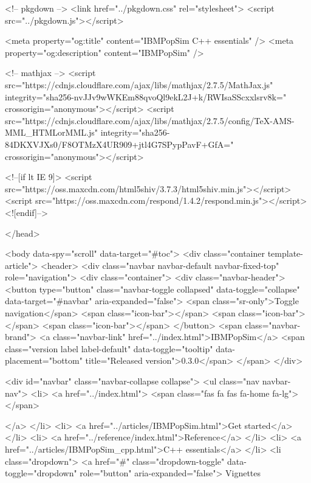 <!-- pkgdown -->
<link href="../pkgdown.css" rel="stylesheet">
<script src="../pkgdown.js"></script>




<meta property="og:title" content="IBMPopSim C++ essentials" />
<meta property="og:description" content="IBMPopSim" />




<!-- mathjax -->
<script src="https://cdnjs.cloudflare.com/ajax/libs/mathjax/2.7.5/MathJax.js" integrity="sha256-nvJJv9wWKEm88qvoQl9ekL2J+k/RWIsaSScxxlsrv8k=" crossorigin="anonymous"></script>
<script src="https://cdnjs.cloudflare.com/ajax/libs/mathjax/2.7.5/config/TeX-AMS-MML_HTMLorMML.js" integrity="sha256-84DKXVJXs0/F8OTMzX4UR909+jtl4G7SPypPavF+GfA=" crossorigin="anonymous"></script>

<!--[if lt IE 9]>
<script src="https://oss.maxcdn.com/html5shiv/3.7.3/html5shiv.min.js"></script>
<script src="https://oss.maxcdn.com/respond/1.4.2/respond.min.js"></script>
<![endif]-->



  </head>

  <body data-spy="scroll" data-target="#toc">
    <div class="container template-article">
      <header>
      <div class="navbar navbar-default navbar-fixed-top" role="navigation">
  <div class="container">
    <div class="navbar-header">
      <button type="button" class="navbar-toggle collapsed" data-toggle="collapse" data-target="#navbar" aria-expanded="false">
        <span class="sr-only">Toggle navigation</span>
        <span class="icon-bar"></span>
        <span class="icon-bar"></span>
        <span class="icon-bar"></span>
      </button>
      <span class="navbar-brand">
        <a class="navbar-link" href="../index.html">IBMPopSim</a>
        <span class="version label label-default" data-toggle="tooltip" data-placement="bottom" title="Released version">0.3.0</span>
      </span>
    </div>

    <div id="navbar" class="navbar-collapse collapse">
      <ul class="nav navbar-nav">
        <li>
  <a href="../index.html">
    <span class="fas fa fas fa-home fa-lg"></span>
     
  </a>
</li>
<li>
  <a href="../articles/IBMPopSim.html">Get started</a>
</li>
<li>
  <a href="../reference/index.html">Reference</a>
</li>
<li>
  <a href="../articles/IBMPopSim_cpp.html">C++ essentials</a>
</li>
<li class="dropdown">
  <a href="#" class="dropdown-toggle" data-toggle="dropdown" role="button" aria-expanded="false">
    Vignettes
     

